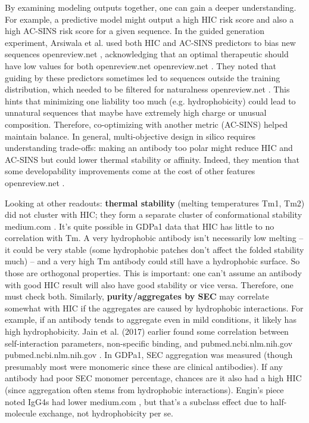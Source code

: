 \documentclass[12pt]{article}
\begin{document}
By examining modeling outputs together, one can gain a deeper understanding. For example, a predictive model might output a high HIC risk score and also a high AC-SINS risk score for a given sequence. In the guided generation experiment, Arsiwala et al. used both HIC and AC-SINS predictors to bias new sequences
openreview.net
, acknowledging that an optimal therapeutic should have low values for both
openreview.net
openreview.net
. They noted that guiding by these predictors sometimes led to sequences outside the training distribution, which needed to be filtered for naturalness
openreview.net
. This hints that minimizing one liability too much (e.g. hydrophobicity) could lead to unnatural sequences that maybe have extremely high charge or unusual composition. Therefore, co-optimizing with another metric (AC-SINS) helped maintain balance. In general, multi-objective design in silico requires understanding trade-offs: making an antibody too polar might reduce HIC and AC-SINS but could lower thermal stability or affinity. Indeed, they mention that some developability improvements come at the cost of other features
openreview.net
.

Looking at other readouts: \textbf{thermal stability} (melting temperatures Tm1, Tm2) did not cluster with HIC; they form a separate cluster of conformational stability
medium.com
. It’s quite possible in GDPa1 data that HIC has little to no correlation with Tm. A very hydrophobic antibody isn’t necessarily low melting – it could be very stable (some hydrophobic patches don’t affect the folded stability much) – and a very high Tm antibody could still have a hydrophobic surface. So those are orthogonal properties. This is important: one can’t assume an antibody with good HIC result will also have good stability or vice versa. Therefore, one must check both. Similarly, \textbf{purity/aggregates by SEC} may correlate somewhat with HIC if the aggregates are caused by hydrophobic interactions. For example, if an antibody tends to aggregate even in mild conditions, it likely has high hydrophobicity. Jain et al. (2017) earlier found some correlation between self-interaction parameters, non-specific binding, and %
pubmed.ncbi.nlm.nih.gov
pubmed.ncbi.nlm.nih.gov
. In GDPa1, SEC aggregation was measured (though presumably most were monomeric since these are clinical antibodies). If any antibody had poor SEC monomer percentage, chances are it also had a high HIC (since aggregation often stems from hydrophobic interactions). Engin’s piece noted IgG4s had lower %
medium.com
, but that’s a subclass effect due to half-molecule exchange, not hydrophobicity per se.
\end{document}
